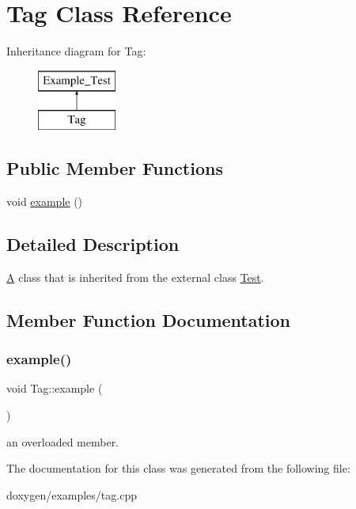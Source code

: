 \hypertarget{class_tag}{}\section{Tag Class Reference}
\label{class_tag}
Inheritance diagram for Tag\+:\begin{figure}[H]
\begin{center}
\leavevmode
\includegraphics[height=2.000000cm]{class_tag}
\end{center}
\end{figure}
\subsection*{Public Member Functions}
\begin{DoxyCompactItemize}
\item 
void \mbox{\hyperlink{class_tag_acc641ffae34e2c4c03a6edf0a513be28}{example}} ()
\end{DoxyCompactItemize}


\subsection{Detailed Description}
\mbox{\hyperlink{class_a}{A}} class that is inherited from the external class \mbox{\hyperlink{class_test}{Test}}. 

\subsection{Member Function Documentation}
\mbox{\label{class_tag_acc641ffae34e2c4c03a6edf0a513be28}} 
\subsubsection{\texorpdfstring{example()}{example()}}
{\footnotesize\ttfamily void Tag\+::example (\begin{DoxyParamCaption}{ }\end{DoxyParamCaption})}

an overloaded member. 

The documentation for this class was generated from the following file\+:\begin{DoxyCompactItemize}
\item 
doxygen/examples/tag.\+cpp\end{DoxyCompactItemize}
